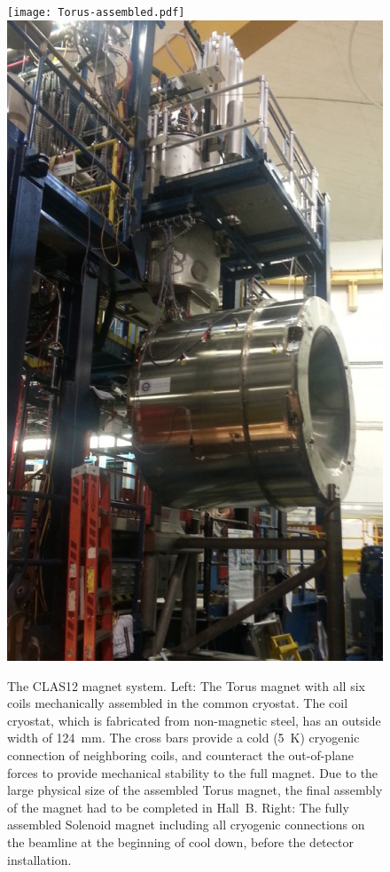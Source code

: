 \documentclass[final,3p,twocolumn]{elsarticle}
\begin{document}
\begin{figure}[htbp!]
\hspace{-0.5cm}\centerline{\texttt{[image: Torus-assembled.pdf]}
\includegraphics[width=0.94\columnwidth]{solenoid-magnet.png}}
\caption{The CLAS12 magnet system. Left: The Torus magnet with all six coils mechanically assembled in the common 
cryostat. The coil cryostat, which is fabricated from non-magnetic steel, has an outside width of 124~mm. The cross
bars provide a cold (5~K) cryogenic connection of neighboring coils, and counteract the out-of-plane forces to provide
mechanical stability to the full magnet. Due to the large physical size of the assembled Torus magnet, the final assembly
of the magnet had to be completed in Hall~B. Right: The fully assembled Solenoid magnet including all cryogenic
connections on the beamline at the beginning of cool down, before the detector installation.}
\label{clas12-magnets}
\end{figure}
\end{document}
